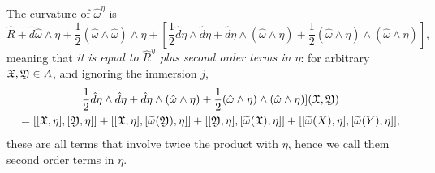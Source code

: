 The curvature of $\hat \omega^\eta$ is 
$$\hat R + \hat d \hat \omega \wedge \eta + \frac{1}{2} (\hat \omega \wedge \hat \omega) \wedge \eta + [\frac{1}{2} \hat d \eta \wedge \hat d \eta + \hat d \eta \wedge (\hat \omega \wedge \eta) + \frac{1}{2} (\hat \omega \wedge \eta) \wedge (\hat \omega \wedge \eta)],$$ 
meaning that \textit{it is equal to $\hat R^\eta$ plus second order terms in $\eta$}: for arbitrary $\mathfrak{X}, \mathfrak{Y} \in A$, and ignoring the immersion $j$, 
\begin{multline}\frac{1}{2} \hat d \eta \wedge \hat d \eta + \hat d \eta \wedge (\hat \omega \wedge \eta) + \frac{1}{2} (\hat \omega \wedge \eta) \wedge (\hat \omega \wedge \eta)](\mathfrak{X}, \mathfrak{Y}) 
\\= [[\mathfrak{X}, \eta], [\mathfrak{Y}, \eta]] + [[\mathfrak{X}, \eta], [\widetilde \omega(\mathfrak{Y}), \eta]] + [[\mathfrak{Y}, \eta], [\widetilde \omega(\mathfrak{X}), \eta]] + [[\widetilde \omega(X), \eta], [\widetilde \omega(Y), \eta]];
\end{multline}
these are all terms that involve twice the product with $\eta$, hence we call them second order terms in $\eta$.

